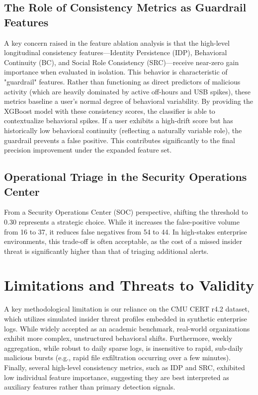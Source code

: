\documentclass[pdflatex,sn-mathphys-num]{sn-jnl}
\theoremstyle{thmstyleone}
\theoremstyle{thmstyletwo}
\theoremstyle{thmstylethree}
\begin{document}
\subsection{The Role of Consistency Metrics as Guardrail Features}\label{subsec6_1}
A key concern raised in the feature ablation analysis is that the high-level longitudinal consistency features—Identity Persistence (IDP), Behavioral Continuity (BC), and Social Role Consistency (SRC)—receive near-zero gain importance when evaluated in isolation. This behavior is characteristic of "guardrail" features. Rather than functioning as direct predictors of malicious activity (which are heavily dominated by active off-hours and USB spikes), these metrics baseline a user's normal degree of behavioral variability. By providing the XGBoost model with these consistency scores, the classifier is able to contextualize behavioral spikes. If a user exhibits a high-drift score but has historically low behavioral continuity (reflecting a naturally variable role), the guardrail prevents a false positive. This contributes significantly to the final precision improvement under the expanded feature set.

\subsection{Operational Triage in the Security Operations Center}\label{subsec6_2}
From a Security Operations Center (SOC) perspective, shifting the threshold to 0.30 represents a strategic choice. While it increases the false-positive volume from 16 to 37, it reduces false negatives from 54 to 44. In high-stakes enterprise environments, this trade-off is often acceptable, as the cost of a missed insider threat is significantly higher than that of triaging additional alerts.

\section{Limitations and Threats to Validity}\label{sec7}
A key methodological limitation is our reliance on the CMU CERT r4.2 dataset, which utilizes simulated insider threat profiles embedded in synthetic enterprise logs. While widely accepted as an academic benchmark, real-world organizations exhibit more complex, unstructured behavioral shifts. Furthermore, weekly aggregation, while robust to daily sparse logs, is insensitive to rapid, sub-daily malicious bursts (e.g., rapid file exfiltration occurring over a few minutes). Finally, several high-level consistency metrics, such as IDP and SRC, exhibited low individual feature importance, suggesting they are best interpreted as auxiliary features rather than primary detection signals.
\end{document}
